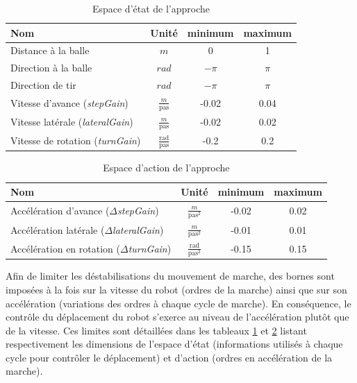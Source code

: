 \begin{table}[h]
  \caption{\label{table:approach_state_space}Espace d'état de l'approche}
  \centering
  \begin{tabular}{|l|c|c|c|}
    \hline
    Nom & Unité & minimum & maximum\\
    \hline
    Distance à la balle & $m$ & 0 & 1\\
    Direction à la balle & $rad$ & $-\pi$ & $\pi$\\
    Direction de tir & $rad$ & $-\pi$ & $\pi$\\
    Vitesse d'avance (\textit{stepGain}) & $\frac{m}{\mathrm{pas}}$ & -0.02 & 0.04\\
    Vitesse latérale (\textit{lateralGain}) & $\frac{m}{\mathrm{pas}}$ & -0.02 & 0.02\\ 
    Vitesse de rotation (\textit{turnGain}) & $\frac{\mathrm{rad}}{\mathrm{pas}}$ & -0.2 & 0.2\\
    \hline
  \end{tabular}
\end{table}

\begin{table}[h]
  \caption{\label{table:approach_action_space}Espace d'action de l'approche}
  \centering
  \begin{tabular}{|l|c|c|c|}
    \hline
    Nom & Unité & minimum & maximum\\
    \hline
    Accélération d'avance ($\Delta$\textit{stepGain}) & $\frac{m}{\mathrm{pas}^2}$            & -0.02 & 0.02  \\
    Accélération latérale ($\Delta$\textit{lateralGain}) & $\frac{m}{\mathrm{pas}^2}$            & -0.01 & 0.01  \\
    Accélération en rotation ($\Delta$\textit{turnGain}) & $\frac{\mathrm{rad}}{\mathrm{pas}^2}$ & -0.15 & 0.15  \\
    \hline
  \end{tabular}
\end{table}

Afin de limiter les déstabilisations du mouvement de marche, des bornes
sont imposées à la fois sur la vitesse du robot (ordres de la marche) ainsi
que sur son accélération (variations des ordres à chaque cycle de marche).
En conséquence, le contrôle du déplacement du robot s'exerce
au niveau de l'accélération plutôt que de la vitesse.
Ces limites sont détaillées dans les tableaux \ref{table:approach_state_space}
et \ref{table:approach_action_space} listant respectivement
les dimensions de l'espace d'état (informations utilisés à chaque cycle pour 
contrôler le déplacement) et d'action (ordres en accélération de la marche).


